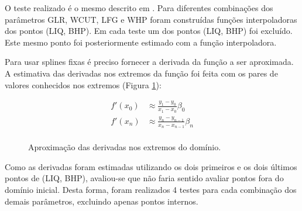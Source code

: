 \documentclass[final,5p]{elsarticle}
\numberwithin{equation}{section}
\begin{document}
        O teste realizado é o mesmo descrito em \cite{relatoriosplinesnaturais}. Para diferentes combinações dos parâmetros GLR, WCUT, LFG e WHP foram construídas funções interpoladoras dos pontos (LIQ, BHP). Em cada teste um dos pontos (LIQ, BHP) foi excluído. Este mesmo ponto foi posteriormente estimado com a função interpoladora.

        Para usar splines fixas é preciso fornecer a derivada da função a ser aproximada. A estimativa das derivadas nos extremos da função foi feita com os pares de valores conhecidos nos extremos (Figura \ref{fig:exvfp}):

        \begin{align*}
            f'(x_0) &\approx \frac{y_1-y_0}{x_1-x_0} \beta_0 \\
            f'(x_n) &\approx \frac{y_n-y_{n-1}}{x_n-x_{n-1}} \beta_n \\
        \end{align*}

        \begin{figure}[hbt!] 
            \caption{Aproximação das derivadas nos extremos do domínio.}
            \label{fig:exvfp}
        \end{figure}
        
        Como as derivadas foram estimadas utilizando os dois primeiros e os dois últimos pontos de (LIQ, BHP), avaliou-se que não faria sentido avaliar pontos fora do domínio inicial. Desta forma, foram realizados 4 testes para cada combinação dos demais parâmetros, excluindo apenas pontos internos. 
\end{document}
